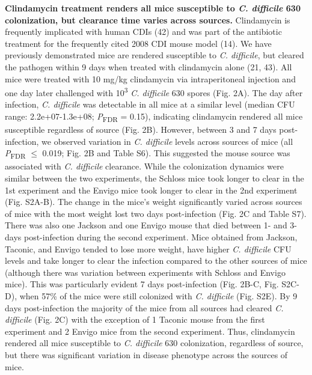 \documentclass[
  11pt,
]{article}
\begin{document}
\textbf{Clindamycin treatment renders all mice susceptible to \emph{C.
difficile} 630 colonization, but clearance time varies across sources.}
Clindamycin is frequently implicated with human CDIs (42) and was part
of the antibiotic treatment for the frequently cited 2008 CDI mouse
model (14). We have previously demonstrated mice are rendered
susceptible to \emph{C. difficile}, but cleared the pathogen within 9
days when treated with clindamycin alone (21, 43). All mice were treated
with 10 mg/kg clindamycin via intraperitoneal injection and one day
later challenged with 10\textsuperscript{3} \emph{C. difficile} 630
spores (Fig. 2A). The day after infection, \emph{C. difficile} was
detectable in all mice at a similar level (median CFU range:
2.2e+07-1.3e+08; \emph{P}\textsubscript{FDR} = 0.15), indicating
clindamycin rendered all mice susceptible regardless of source (Fig.
2B). However, between 3 and 7 days post-infection, we observed variation
in \emph{C. difficile} levels across sources of mice (all
\emph{P}\textsubscript{FDR} \(\le\) 0.019; Fig. 2B and Table S6). This
suggested the mouse source was associated with \emph{C. difficile}
clearance. While the colonization dynamics were similar between the two
experiments, the Schloss mice took longer to clear in the 1st experiment
and the Envigo mice took longer to clear in the 2nd experiment (Fig.
S2A-B). The change in the mice's weight significantly varied across
sources of mice with the most weight lost two days post-infection (Fig.
2C and Table S7). There was also one Jackson and one Envigo mouse that
died between 1- and 3-days post-infection during the second experiment.
Mice obtained from Jackson, Taconic, and Envigo tended to lose more
weight, have higher \emph{C. difficile} CFU levels and take longer to
clear the infection compared to the other sources of mice (although
there was variation between experiments with Schloss and Envigo mice).
This was particularly evident 7 days post-infection (Fig. 2B-C, Fig.
S2C-D), when 57\% of the mice were still colonized with \emph{C.
difficile} (Fig. S2E). By 9 days post-infection the majority of the mice
from all sources had cleared \emph{C. difficile} (Fig. 2C) with the
exception of 1 Taconic mouse from the first experiment and 2 Envigo mice
from the second experiment. Thus, clindamycin rendered all mice
susceptible to \emph{C. difficile} 630 colonization, regardless of
source, but there was significant variation in disease phenotype across
the sources of mice.
\end{document}
